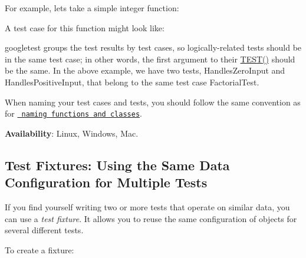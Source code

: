 For example, let\textquotesingle{}s take a simple integer function\+:


\begin{DoxyCode}{0}
\end{DoxyCode}


A test case for this function might look like\+:


\begin{DoxyCode}{0}
\DoxyCodeLine{\}}
\DoxyCodeLine{}
\DoxyCodeLine{\}}
\end{DoxyCode}


googletest groups the test results by test cases, so logically-\/related tests should be in the same test case; in other words, the first argument to their {\ttfamily \mbox{\hyperlink{googletest-master_2googletest_2include_2gtest_2gtest_8h_ab5540a6d621853916be8240ff51819cf}{T\+E\+S\+T()}}} should be the same. In the above example, we have two tests, {\ttfamily Handles\+Zero\+Input} and {\ttfamily Handles\+Positive\+Input}, that belong to the same test case {\ttfamily Factorial\+Test}.

When naming your test cases and tests, you should follow the same convention as for \href{https://google.github.io/styleguide/cppguide.html\#Function_Names}{\texttt{ naming functions and classes}}.

{\bfseries{Availability}}\+: Linux, Windows, Mac.

\subsection*{Test Fixtures\+: Using the Same Data Configuration for Multiple Tests}

If you find yourself writing two or more tests that operate on similar data, you can use a {\itshape test fixture}. It allows you to reuse the same configuration of objects for several different tests.

To create a fixture\+:


